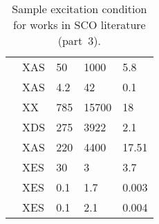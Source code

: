 \begin{table}[htp!]
{\begin{tabular}{ C{1cm}  C{2cm} C{2.65cm} C{2.75cm} C{1cm} }
      \cite{Marino2016}              & XAS    & 50      & 1000   & 5.8   \\
      \cite{VanKuiken2016}           & XAS    & 4.2     & 42     & 0.1  \\
      \cite{Haldrup2016}             & XX     & 785     & 15700  & 18 \\
      \cite{Biasin2016}              & XDS    & 275     & 3922   & 2.1  \\
      \cite{Lemke2017}               & XAS    & 220     & 4400   & 17.51 \\
      \cite{March2017}               & XES    & 30      & 3      & 3.7  \\
      \cite{Zhang2017}               & XES    & 0.1     & 1.7    & 0.003 \\
      \cite{Kjaer2017}               & XES    & 0.1     & 2.1    & 0.004 \\
      \bottomrule
  \end{tabular}
  }
  \caption{Sample excitation condition for works in SCO literature (part~3).}
  \label{tab: SCO-exc-app-3}
\end{table}

